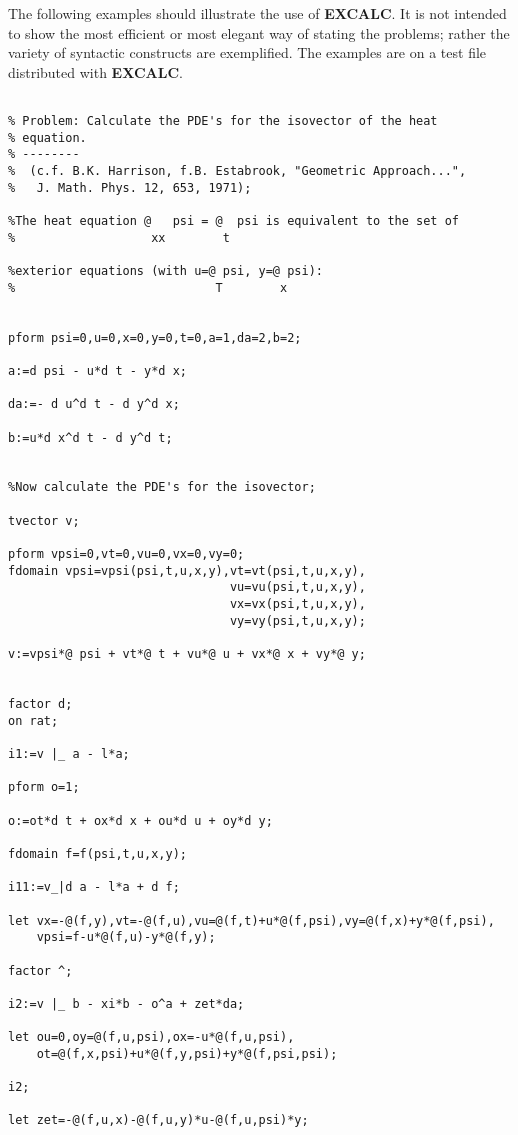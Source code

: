 The following examples should illustrate the use of {\bf EXCALC}. It is not
intended to show the most efficient or most elegant way of stating the
problems; rather the variety of syntactic constructs are exemplified.
The examples are on a test file distributed with {\bf EXCALC}.
{\small
\begin{verbatim}

% Problem: Calculate the PDE's for the isovector of the heat
% equation.
% --------
%  (c.f. B.K. Harrison, f.B. Estabrook, "Geometric Approach...",
%   J. Math. Phys. 12, 653, 1971);

%The heat equation @   psi = @  psi is equivalent to the set of 
%                   xx        t

%exterior equations (with u=@ psi, y=@ psi):
%                            T        x


pform psi=0,u=0,x=0,y=0,t=0,a=1,da=2,b=2;

a:=d psi - u*d t - y*d x;

da:=- d u^d t - d y^d x;

b:=u*d x^d t - d y^d t;


%Now calculate the PDE's for the isovector;

tvector v;

pform vpsi=0,vt=0,vu=0,vx=0,vy=0;
fdomain vpsi=vpsi(psi,t,u,x,y),vt=vt(psi,t,u,x,y),
                               vu=vu(psi,t,u,x,y),
                               vx=vx(psi,t,u,x,y),
                               vy=vy(psi,t,u,x,y);

v:=vpsi*@ psi + vt*@ t + vu*@ u + vx*@ x + vy*@ y;


factor d;
on rat;

i1:=v |_ a - l*a;

pform o=1;

o:=ot*d t + ox*d x + ou*d u + oy*d y;

fdomain f=f(psi,t,u,x,y);

i11:=v_|d a - l*a + d f;

let vx=-@(f,y),vt=-@(f,u),vu=@(f,t)+u*@(f,psi),vy=@(f,x)+y*@(f,psi),
    vpsi=f-u*@(f,u)-y*@(f,y);

factor ^;

i2:=v |_ b - xi*b - o^a + zet*da;

let ou=0,oy=@(f,u,psi),ox=-u*@(f,u,psi),
    ot=@(f,x,psi)+u*@(f,y,psi)+y*@(f,psi,psi);

i2;

let zet=-@(f,u,x)-@(f,u,y)*u-@(f,u,psi)*y;


\end{verbatim}}
